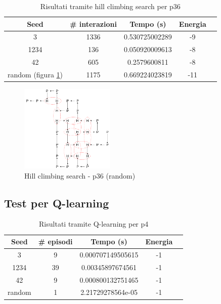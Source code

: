 \documentclass[conference]{IEEEtran}
\begin{document}
\begin{table}[H]
\begin{center}
\begin{tabular}{|c|c|c|c|c|}
\hline
\textbf{Seed} & \textbf{\# interazioni} & \textbf{Tempo (s)} & \textbf{Energia} \\ \hline
3 & 1336 & 0.530725002289 & -9 \\ \hline
1234 & 136 & 0.050920009613 & -8 \\ \hline
42 & 605 & 0.2579600811 & -8 \\ \hline
random (figura \ref{fig:lsp36}) & 1175 & 0.669224023819 & -11 \\ \hline
\end{tabular}
\end{center}
\caption{Risultati tramite hill climbing search per p36}
\end{table}

\begin{figure}[H]
\centering
\includegraphics[width=0.4\textwidth]{figure/p36LS.png}
\caption{Hill climbing search - p36 (random)}
\label{fig:lsp36}
\end{figure}

\subsection{Test per Q-learning}

\begin{table}[H]
\begin{center}
\begin{tabular}{|c|c|c|c|c|}
\hline
\textbf{Seed} & \textbf{\# episodi} & \textbf{Tempo (s)} & \textbf{Energia} \\ \hline
3 & 9 & 0.000707149505615 & -1 \\ \hline
1234 & 39 & 0.00345897674561 & -1 \\ \hline
42 & 9 & 0.000800132751465 & -1 \\ \hline
random & 1 & 2.21729278564e-05 & -1 \\ \hline
\end{tabular}
\end{center}
\caption{Risultati tramite Q-learning per p4}
\end{table}
\end{document}
